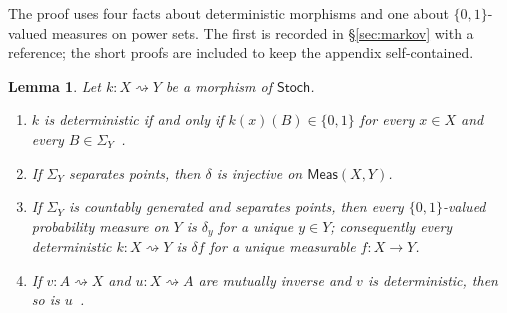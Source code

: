 \documentclass[11pt,a4paper]{article}
\theoremstyle{plain}
\newtheorem{lemma}[theorem]{Lemma}
\theoremstyle{definition}
\theoremstyle{remark}
\newcommand{\cat}[1]{\mathsf{#1}}
\newcommand{\Meas}{\cat{Meas}}
\newcommand{\Stoch}{\cat{Stoch}}
\newcommand{\del}{\delta}
\begin{document}
The proof uses four facts about deterministic morphisms and one about
$\{0,1\}$-valued measures on power sets. The first is recorded in
\S\ref{sec:markov} with a reference; the short proofs are included to keep
the appendix self-contained.

\begin{lemma}\label{lem:app-det}
Let $k \colon X \rightsquigarrow Y$ be a morphism of $\Stoch$.
\begin{enumerate}
\item $k$ is deterministic if and only if $k(x)(B) \in \{0,1\}$ for every
$x \in X$ and every $B \in \Sigma_Y$~\cite[Ex.~10.4]{fritz_synthetic_2020}.
\item If $\Sigma_Y$ separates points, then $\del$ is injective on
$\Meas(X,Y)$.
\item If $\Sigma_Y$ is countably generated and separates points, then every
$\{0,1\}$-valued probability measure on $Y$ is $\delta_y$ for a unique
$y \in Y$; consequently every deterministic $k \colon X \rightsquigarrow Y$
is $\del f$ for a unique measurable $f \colon X \to Y$.
\item If $v \colon A \rightsquigarrow X$ and $u \colon X \rightsquigarrow A$
are mutually inverse and $v$ is deterministic, then so is
$u$~\cite[Lem.~10.9(c)]{fritz_synthetic_2020}.
\end{enumerate}
\end{lemma}
\end{document}
